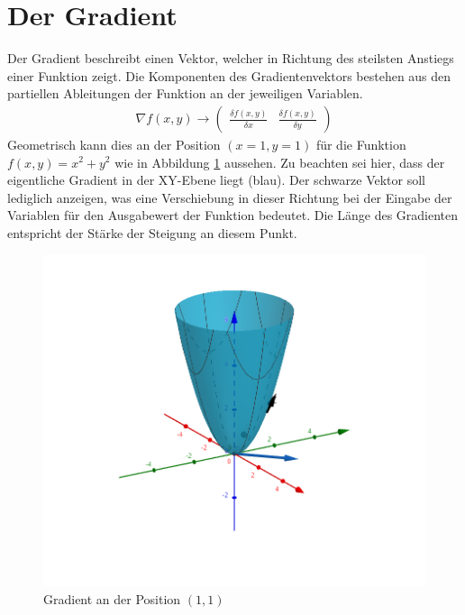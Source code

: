 \section{Der Gradient}\label{chapter:00_gradient}
Der Gradient beschreibt einen Vektor, welcher in Richtung des steilsten Anstiegs einer Funktion zeigt.
Die Komponenten des Gradientenvektors bestehen aus den partiellen Ableitungen der Funktion an der jeweiligen Variablen.
\begin{align}
    \nabla f(x,y) \longrightarrow \begin{pmatrix} \frac{\delta f(x,y)}{\delta x} & \frac{\delta f(x,y)}{\delta y} \end{pmatrix}
\end{align}
Geometrisch kann dies an der Position $(x = 1, y = 1)$ für die Funktion $f(x, y) = x^2 + y^2$  wie in Abbildung
\ref{fig:01_gradient} aussehen. Zu beachten sei hier, dass der eigentliche Gradient in der XY-Ebene liegt (blau).
Der schwarze Vektor soll lediglich anzeigen, was eine Verschiebung in dieser Richtung bei der Eingabe der Variablen
für den Ausgabewert der Funktion bedeutet. Die Länge des Gradienten entspricht der Stärke der Steigung an diesem Punkt.

\begin{figure}[h!]
    \begin{center}
        \includegraphics[width=0.5\linewidth]{../common/02_appendix/00_resources/01_gradient.png}
    \end{center}
    \caption{Gradient an der Position $(1, 1)$}
    \label{fig:01_gradient}
\end{figure}

